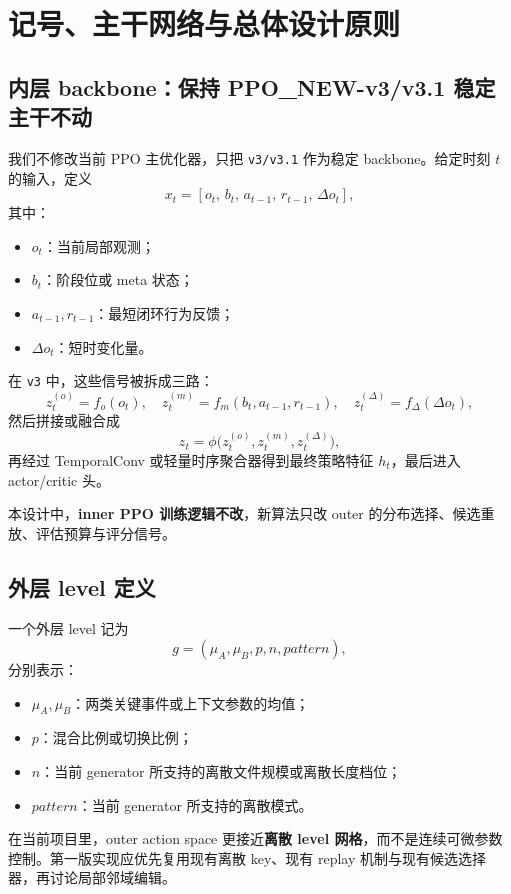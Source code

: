 \documentclass[11pt,a4paper]{ctexart}
\begin{document}
\section{记号、主干网络与总体设计原则}

\subsection{内层 backbone：保持 PPO\_NEW-v3/v3.1 稳定主干不动}
我们不修改当前 PPO 主优化器，只把 \texttt{v3/v3.1} 作为稳定 backbone。给定时刻 \(t\) 的输入，定义
\[
 x_t=[o_t,\,b_t,\,a_{t-1},\,r_{t-1},\,\Delta o_t],
\]
其中：
\begin{itemize}[leftmargin=2.2em,itemsep=0.2em]
    \item \(o_t\)：当前局部观测；
    \item \(b_t\)：阶段位或 meta 状态；
    \item \(a_{t-1},r_{t-1}\)：最短闭环行为反馈；
    \item \(\Delta o_t\)：短时变化量。
\end{itemize}

在 \texttt{v3} 中，这些信号被拆成三路：
\[
 z_t^{(o)}=f_o(o_t),\quad z_t^{(m)}=f_m(b_t,a_{t-1},r_{t-1}),\quad z_t^{(\Delta)}=f_{\Delta}(\Delta o_t),
\]
然后拼接或融合成
\[
 z_t = \phi\big(z_t^{(o)}, z_t^{(m)}, z_t^{(\Delta)}\big),
\]
再经过 TemporalConv 或轻量时序聚合器得到最终策略特征 \(h_t\)，最后进入 actor/critic 头。

本设计中，\textbf{inner PPO 训练逻辑不改}，新算法只改 outer 的分布选择、候选重放、评估预算与评分信号。

\subsection{外层 level 定义}
一个外层 level 记为
\[
 g=(\mu_A,\mu_B,p,n,pattern),
\]
分别表示：
\begin{itemize}[leftmargin=2.2em,itemsep=0.2em]
    \item \(\mu_A,\mu_B\)：两类关键事件或上下文参数的均值；
    \item \(p\)：混合比例或切换比例；
    \item \(n\)：当前 generator 所支持的离散文件规模或离散长度档位；
    \item \(pattern\)：当前 generator 所支持的离散模式。
\end{itemize}
在当前项目里，outer action space 更接近\textbf{离散 level 网格}，而不是连续可微参数控制。第一版实现应优先复用现有离散 key、现有 replay 机制与现有候选选择器，再讨论局部邻域编辑。
\end{document}
